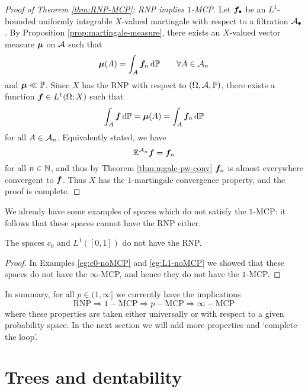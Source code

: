 \begin{proof}[Proof of Theorem \ref{thm:RNP-MCP}: RNP implies $1$-MCP]
  Let $\bm{f}_{\bullet}$ be an $L^1$-bounded uniformly integrable $X$-valued martingale with respect to a filtration $\mathcal{A}_{\bullet}$.
  By Proposition \ref{prop:martingale-measure}, there exists an $X$-valued vector measure $\bm{\mu}$ on $\mathcal{A}$ such that
  \begin{equation*}
    \bm{\mu}(A) = \int_{A} \bm{f}_n \, \mathrm{d}\mathbb{P} \qquad \forall A \in \mathcal{A}_n
  \end{equation*}
  and $\bm{\mu} \ll \mathbb{P}$.
  Since $X$ has the RNP with respect to $(\Omega,\mathcal{A},\mathbb{P})$, there exists a function $\bm{f} \in L^1(\Omega;X)$ such that
  \begin{equation*}
    \int_{A} \bm{f} \, \mathrm{d}\mathbb{P} = \bm{\mu}(A) = \int_A \bm{f}_n \, \mathrm{d}\mathbb{P}
  \end{equation*}
  for all $A \in \mathcal{A}_n$.
  Equivalently stated, we have
  \begin{equation*}
    \mathbb{E}^{\mathcal{A}_n} \bm{f} = \bm{f}_n
  \end{equation*}
  for all $n \in \mathbb{N}$, and thus by Theorem \ref{thm:mgale-pw-conv} $\bm{f}_n$ is almost everywhere convergent to $\bm{f}$.
  Thus $X$ has the $1$-martingale convergence property, and the proof is complete.
\end{proof}

We already have some examples of spaces which do not satisfy the $1$-MCP: it follows that these spaces cannot have the RNP either.

\begin{cor}
  The spaces $c_0$ and $L^1([0,1])$ do not have the RNP.
\end{cor}

\begin{proof}
  In Examples \ref{eg:c0-noMCP} and \ref{eg:L1-noMCP} we showed that these spaces do not have the $\infty$-MCP, and hence they do not have the $1$-MCP. 
\end{proof} 

In summary, for all $p \in (1,\infty]$ we currently have the implications
\begin{equation*}
  \mathrm{RNP} \Longrightarrow 1-\mathrm{MCP} \Longrightarrow p-\mathrm{MCP} \Longrightarrow \infty-\mathrm{MCP}
\end{equation*}
where these properties are taken either universally or with respect to a given probability space.
In the next section we will add more properties and `complete the loop'.

\section{Trees and dentability}

